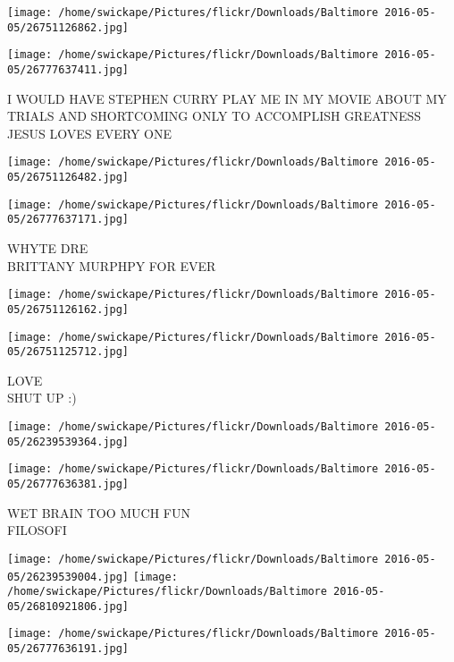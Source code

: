 \documentclass[10pt,letterpaper]{article}
\begin{document}
\texttt{[image: /home/swickape/Pictures/flickr/Downloads/Baltimore 2016-05-05/26751126862.jpg]}

\vspace{0.25in}
\texttt{[image: /home/swickape/Pictures/flickr/Downloads/Baltimore 2016-05-05/26777637411.jpg]}

I WOULD HAVE STEPHEN CURRY PLAY ME IN MY MOVIE ABOUT MY TRIALS AND SHORTCOMING ONLY TO ACCOMPLISH GREATNESS\\
JESUS LOVES EVERY ONE\\
\pagebreak

\texttt{[image: /home/swickape/Pictures/flickr/Downloads/Baltimore 2016-05-05/26751126482.jpg]}

\vspace{0.25in}
\texttt{[image: /home/swickape/Pictures/flickr/Downloads/Baltimore 2016-05-05/26777637171.jpg]}

WHYTE DRE\\
BRITTANY MURPHPY FOR EVER\\
\pagebreak

\texttt{[image: /home/swickape/Pictures/flickr/Downloads/Baltimore 2016-05-05/26751126162.jpg]}

\vspace{0.25in}
\texttt{[image: /home/swickape/Pictures/flickr/Downloads/Baltimore 2016-05-05/26751125712.jpg]}

LOVE\\
SHUT UP :)\\
\pagebreak

\texttt{[image: /home/swickape/Pictures/flickr/Downloads/Baltimore 2016-05-05/26239539364.jpg]}

\vspace{0.25in}
\texttt{[image: /home/swickape/Pictures/flickr/Downloads/Baltimore 2016-05-05/26777636381.jpg]}

WET BRAIN TOO MUCH FUN\\
FILOSOFI\\
\pagebreak

\texttt{[image: /home/swickape/Pictures/flickr/Downloads/Baltimore 2016-05-05/26239539004.jpg]}
\texttt{[image: /home/swickape/Pictures/flickr/Downloads/Baltimore 2016-05-05/26810921806.jpg]}

\vspace{0.25in}
\texttt{[image: /home/swickape/Pictures/flickr/Downloads/Baltimore 2016-05-05/26777636191.jpg]}
\end{document}
